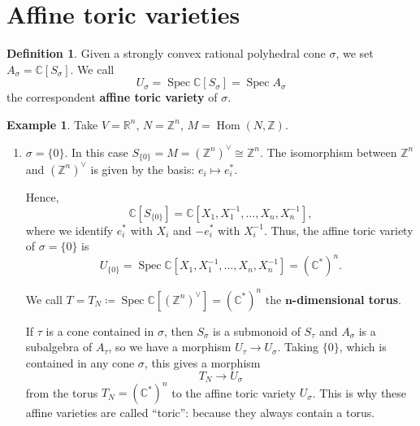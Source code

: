 \documentclass[12pt]{article}
\theoremstyle{definition}
\newtheorem*{definition}{Definition}
\newtheorem*{example}{Example}
\DeclareMathOperator{\Hom}{Hom}
\DeclareMathOperator{\Spec}{Spec}
\begin{document}
\section{Affine toric varieties}
\begin{definition}
Given a strongly convex rational polyhedral cone $\sigma$, we set $A_{\sigma}=\mathbb{C}[S_{\sigma}]$. We call
\[U_{\sigma}=\Spec\mathbb{C}[S_{\sigma}]=\Spec A_{\sigma}\]
the correspondent \textbf{affine toric variety} of $\sigma$.
\end{definition}

\begin{example}
Take $V=\mathbb{R}^n$, $N=\mathbb{Z}^n$, $M=\Hom(N,\mathbb{Z})$.
\begin{enumerate}[label=\arabic*)]
\item $\sigma=\{0\}$. In this case $S_{\{0\}}=M=(\mathbb{Z}^n)^{\vee}\cong\mathbb{Z}^n$. The isomorphism between $\mathbb{Z}^n$ and $(\mathbb{Z}^n)^{\vee}$ is given by the basis: $e_i\mapsto e_i^*$.

Hence,
\[\mathbb{C}[S_{\{0\}}]=\mathbb{C}[X_1,X_1^{-1},\ldots,X_n,X_n^{-1}],\]
where we identify $e_i^*$ with $X_i$ and $-e_i^*$ with $X_i^{-1}$. Thus, the affine toric variety of $\sigma=\{0\}$ is
\[U_{\{0\}}=\Spec\mathbb{C}[X_1,X_1^{-1},\ldots,X_n,X_n^{-1}]=(\mathbb{C}^*)^n.\]

We call $T=T_N\coloneqq\Spec\mathbb{C}[(\mathbb{Z}^n)^{\vee}]=(\mathbb{C}^*)^n$ the $\boldsymbol{n}$\textbf{-dimensional torus}.

If $\tau$ is a cone contained in $\sigma$, then $S_{\sigma}$ is a submonoid of $S_{\tau}$ and $A_{\sigma}$ is a subalgebra of $A_{\tau}$, so we have a morphism $U_{\tau}\rightarrow U_{\sigma}$. Taking $\{0\}$, which is contained in any cone $\sigma$, this gives a morphism
\[T_N\longrightarrow U_{\sigma}\]
from the torus $T_N=(\mathbb{C}^*)^n$ to the affine toric variety $U_{\sigma}$. This is why these affine varieties are called ``toric'': because they always contain a torus.

%


\end{enumerate}
\end{example}
\end{document}
